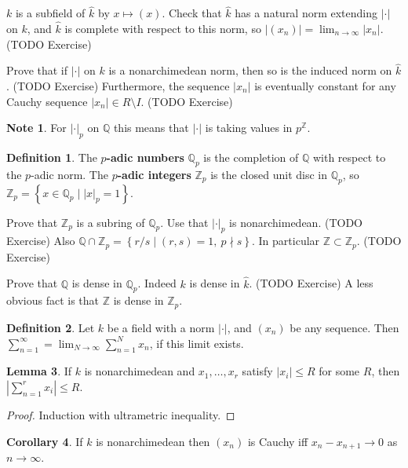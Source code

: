 \documentclass{article}
\newcommand{\Z}{\mathbb{Z}}
\newcommand{\Q}{\mathbb{Q}}
\newcommand{\rb}[1]{\left( #1 \right)}
\newcommand{\cb}[1]{\left\{ #1 \right\}}
\newcommand{\abs}[1]{\left\lvert #1 \right\rvert}
\theoremstyle{definition}\newtheorem{definition}{Definition}[section]
\theoremstyle{definition}\newtheorem{remark}[definition]{Remark}
\theoremstyle{definition}\newtheorem*{example}{Example}
\theoremstyle{definition}\newtheorem*{note}{Note}
\newtheorem{lemma}[definition]{Lemma}
\newtheorem{corollary}[definition]{Corollary}
\begin{document}
$ k $ is a subfield of $ \hat{k} $ by $ x \mapsto \rb{x} $. Check that $ \hat{k} $ has a natural norm extending $ \abs{\cdot} $ on $ k $, and $ \hat{k} $ is complete with respect to this norm, so $ \abs{\rb{x_n}} = \lim_{n \to \infty} \abs{x_n} $. (TODO Exercise)

Prove that if $ \abs{\cdot} $ on $ k $ is a nonarchimedean norm, then so is the induced norm on $ \hat{k} $. (TODO Exercise) Furthermore, the sequence $ \abs{x_n} $ is eventually constant for any Cauchy sequence $ \abs{x_n} \in R \setminus I $. (TODO Exercise)

\begin{note}
For $ \abs{\cdot}_p $ on $ \Q $ this means that $ \abs{\cdot} $ is taking values in $ p^{\Z} $.
\end{note}

\begin{definition}
The \textbf{$ p $-adic numbers} $ \Q_p $ is the completion of $ \Q $ with respect to the $ p $-adic norm. The \textbf{$ p $-adic integers} $ \Z_p $ is the closed unit disc in $ \Q_p $, so $ \Z_p = \cb{x \in \Q_p \mid \abs{x}_p = 1} $.
\end{definition}

Prove that $ \Z_p $ is a subring of $ \Q_p $. Use that $ \abs{\cdot}_p $ is nonarchimedean. (TODO Exercise) Also $ \Q \cap \Z_p = \cb{r / s \mid \rb{r, s} = 1, \ p \nmid s} $. In particular $ \Z \subset \Z_p $. (TODO Exercise)

Prove that $ \Q $ is dense in $ \Q_p $. Indeed $ k $ is dense in $ \hat{k} $. (TODO Exercise) A less obvious fact is that $ \Z $ is dense in $ \Z_p $.

\begin{definition}
Let $ k $ be a field with a norm $ \abs{\cdot} $, and $ \rb{x_n} $ be any sequence. Then $ \sum_{n = 1}^\infty = \lim_{N \to \infty} \sum_{n = 1}^N x_n $, if this limit exists.
\end{definition}

\begin{lemma}
\label{lem:1.10}
If $ k $ is nonarchimedean and $ x_1, \dots, x_r $ satisfy $ \abs{x_i} \le R $ for some $ R $, then $ \abs{\sum_{n = 1}^r x_i} \le R $.
\end{lemma}

\begin{proof}
Induction with ultrametric inequality.
\end{proof}

\begin{corollary}
\label{cor:1.11}
If $ k $ is nonarchimedean then $ \rb{x_n} $ is Cauchy iff $ x_n - x_{n + 1} \to 0 $ as $ n \to \infty $.
\end{corollary}
\end{document}
